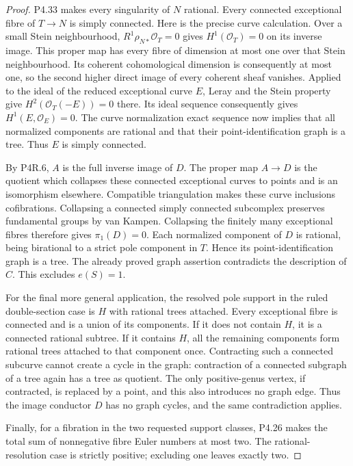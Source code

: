 \begin{proof}
P4.33 makes every singularity of $N$ rational.
Every connected exceptional fibre of $T\to N$
is simply connected. Here is the precise curve
calculation. Over a small Stein neighbourhood,
$R^1\rho_{N*}\mathcal O_T=0$ gives
$H^1(\mathcal O_T)=0$ on its inverse image.
This proper map has every fibre of dimension at
most one over that Stein neighbourhood. Its coherent
cohomological dimension is consequently at most
one, so the second higher direct image of every
coherent sheaf vanishes. Applied to the ideal of the reduced
exceptional curve $E$, Leray and the Stein property
give $H^2(\mathcal O_T(-E))=0$ there. Its ideal
sequence consequently gives $H^1(E,\mathcal O_E)=0$.
The curve normalization exact sequence now implies
that all normalized components are rational and
that their point-identification graph is a tree.
Thus $E$ is simply connected.

By P4R.6, $A$ is the full inverse image of $D$.
The proper map $A\to D$ is the quotient which
collapses these connected exceptional curves to
points and is an isomorphism elsewhere.
Compatible triangulation makes these curve
inclusions cofibrations. Collapsing a connected
simply connected subcomplex preserves fundamental
groups by van Kampen. Collapsing the finitely many
exceptional fibres therefore gives $\pi_1(D)=0$.
Each normalized component of $D$ is rational,
being birational to a strict pole component in
$T$. Hence its point-identification graph is a
tree. The already proved graph assertion contradicts
the description of $C$. This excludes $e(S)=1$.

For the final more general application, the
resolved pole support in the ruled double-section
case is $H$ with rational trees attached.
Every exceptional fibre is connected and is a
union of its components. If it does not contain
$H$, it is a connected rational subtree. If it
contains $H$, all the remaining components form
rational trees attached to that component once.
Contracting such a connected subcurve cannot
create a cycle in the graph: contraction of a
connected subgraph of a tree again has a tree
as quotient. The only positive-genus vertex,
if contracted, is replaced by a point, and this
also introduces no graph edge. Thus the image
conductor $D$ has no graph cycles, and the same
contradiction applies.

Finally, for a fibration in the two requested
support classes, P4.26 makes the total sum of
nonnegative fibre Euler numbers at most two.
The rational-resolution case is strictly positive;
excluding one leaves exactly two.
\end{proof}
